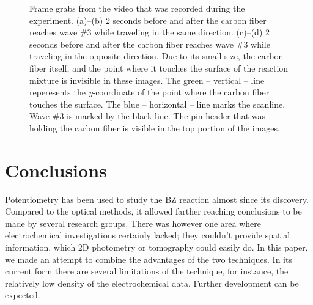\documentclass[3p, twocolumn]{elsarticle}
\begin{document}
\begin{figure}
\centering
{}
\caption{Frame grabs from the video that was recorded during the experiment.
(a)--(b) 2 seconds before and after the carbon fiber reaches wave \#3 while traveling in the same direction.
(c)--(d) 2 seconds before and after the carbon fiber reaches wave \#3 while traveling in the opposite direction.
Due to its small size, the carbon fiber itself, and the point where it touches the surface of the reaction mixture is invisible in these images.
The green -- vertical -- line reperesents the \emph{y}-coordinate of the point where the carbon fiber touches the surface.
The blue -- horizontal -- line marks the scanline.
Wave \#3 is marked by the black line.
The pin header that was holding the carbon fiber is visible in the top portion of the images.
}
\label{fig:grabs2}
\end{figure}

\section{Conclusions}
Potentiometry has been used to study the BZ reaction almost since its discovery.
Compared to the optical methods, it allowed farther reaching conclusions to be made by several research groups.
There was however one area where electrochemical investigations certainly lacked; they couldn't provide spatial information, which 2D photometry or tomography could easily do.
In this paper, we made an attempt to combine the advantages of the two techniques.
In its current form there are several limitations of the technique, for instance, the relatively low density of the electrochemical data.
Further development can be expected.
\end{document}
